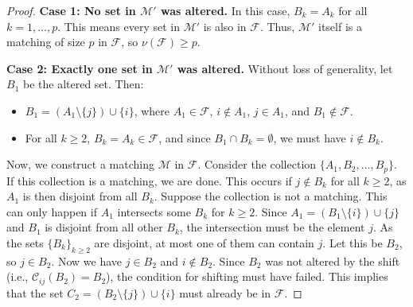 \documentclass[runningheads,12pt,a4paper]{article}
\begin{document}
\begin{proof}
	\textbf{Case 1: No set in $\mathcal{M}'$ was altered.}
	In this case, $B_k = A_k$ for all $k=1, \dots, p$. This means every set in $\mathcal{M}'$ is also in $\mathcal{F}$. Thus, $\mathcal{M}'$ itself is a matching of size $p$ in $\mathcal{F}$, so $\nu(\mathcal{F}) \ge p$.
	
	\textbf{Case 2: Exactly one set in $\mathcal{M}'$ was altered.}
	Without loss of generality, let $B_1$ be the altered set. Then:
	\begin{itemize}
		\item $B_1 = (A_1 \setminus \{j\}) \cup \{i\}$, where $A_1 \in \mathcal{F}$, $i \notin A_1$, $j \in A_1$, and $B_1 \notin \mathcal{F}$.
		\item For all $k \geq 2$, $B_k = A_k \in \mathcal{F}$, and since $B_1 \cap B_k = \emptyset$, we must have $i \notin B_k$.
	\end{itemize}
	
	Now, we construct a matching $\mathcal{M}$ in $\mathcal{F}$. Consider the collection $\{A_1, B_2,\allowbreak \dots, B_p\}$.
	If this collection is a matching, we are done. This occurs if $j \notin B_k$ for all $k \geq 2$, as $A_1$ is then disjoint from all $B_k$.
	Suppose the collection is not a matching. This can only happen if $A_1$ intersects some $B_k$ for $k \geq 2$. Since $A_1 = (B_1 \setminus \{i\}) \cup \{j\}$ and $B_1$ is disjoint from all other $B_k$, the intersection must be the element $j$. As the sets $\{B_k\}_{k \geq 2}$ are disjoint, at most one of them can contain $j$. Let this be $B_2$, so $j \in B_2$.
	Now we have $j \in B_2$ and $i \notin B_2$. Since $B_2$ was not altered by the shift (i.e., $\mathcal{C}_{ij}(B_2) = B_2$), the condition for shifting must have failed. This implies that the set $C_2 = (B_2 \setminus \{j\}) \cup \{i\}$ must already be in $\mathcal{F}$.
	

\end{proof}
\end{document}

